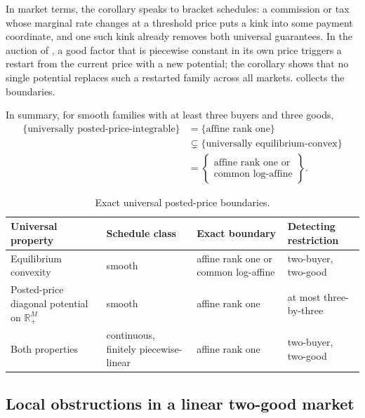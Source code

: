 \documentclass[11pt,a4paper,fleqn]{article}
\theoremstyle{plain}
\theoremstyle{definition}
\newcommand{\R}{\mathbb{R}}
\begin{document}
In market terms, the corollary speaks to bracket schedules: a commission or tax whose marginal rate changes at a threshold price puts a kink into some payment coordinate, and one such kink already removes both universal guarantees. In the auction of \citet{okisato2026}, a good factor that is piecewise constant in its own price triggers a restart from the current price with a new potential; the corollary shows that no single potential replaces such a restarted family across all markets.  collects the boundaries.

In summary, for smooth families with at least three buyers and three goods,
\[
\begin{aligned}
\{\text{universally posted-price-integrable}\}
&=\{\text{affine rank one}\}\\
&\subsetneq
\{\text{universally equilibrium-convex}\}\\
&=\left\{\substack{\text{affine rank one or}\\
\text{common log-affine}}\right\}.
\end{aligned}
\]

\begin{table}[!t]
\centering
\caption{Exact universal posted-price boundaries.}
\label{tab:results-summary}
\small
\setlength{\tabcolsep}{4pt}
\begin{tabular}{@{}>{\raggedright\arraybackslash}p{}>{\raggedright\arraybackslash}p{}>{\raggedright\arraybackslash}p{}>{\raggedright\arraybackslash}p{}@{}}
\toprule
Universal property & Schedule class & Exact boundary & Detecting restriction \\
\midrule
Equilibrium convexity & smooth & affine rank one or common log-affine & two-buyer, two-good \\
Posted-price diagonal potential on $\R_+^M$ & smooth & affine rank one & at most three-by-three \\
Both properties & continuous, finitely piecewise-linear & affine rank one & two-buyer, two-good \\
\bottomrule
\end{tabular}
\end{table}

\subsection{Local obstructions in a linear two-good market}\label{subsec:path-relaxations}
\end{document}
